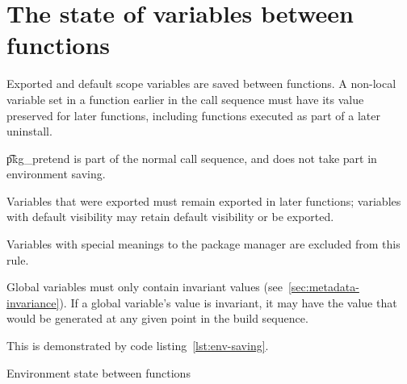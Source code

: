 \section{The state of variables between functions}
\label{sec:ebuild-env-state}

Exported and default scope variables are saved between functions. A non-local variable set in a
function earlier in the call sequence must have its value preserved for later functions, including
functions executed as part of a later uninstall.

\note \t{pkg\_pretend} is  part of the normal call sequence, and does not take part in
environment saving.

Variables that were exported must remain exported in later functions; variables with default
visibility may retain default visibility or be exported.

Variables with special meanings to the package manager are excluded from this rule.

Global variables must only contain invariant values (see~\ref{sec:metadata-invariance}). If a global
variable's value is invariant, it may have the value that would be generated at any given point
in the build sequence.

This is demonstrated by code listing~\ref{lst:env-saving}.

\begin{listing}
  \caption{Environment state between functions}\label{lst:env-saving}
  
\end{listing}


